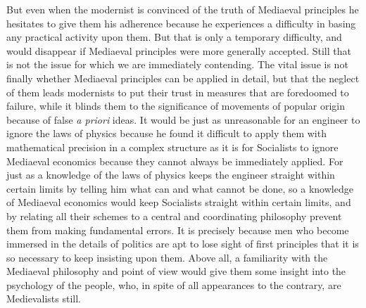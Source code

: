\documentclass{book}
\begin{document}
But even when the modernist is convinced of the truth of Mediaeval principles he hesitates to give them his adherence because he experiences a difficulty in basing any practical activity upon them. But that is only a temporary difficulty, and would disappear if Mediaeval principles were more generally accepted. Still that is not the issue for which we are immediately contending. The vital issue is not finally whether Mediaeval principles can be applied in detail, but that the neglect of them leads modernists to put their trust in measures that are foredoomed to failure, while it blinds them to the significance of movements of popular origin because of false \emph{a priori} ideas. It would be just as unreasonable for an engineer to ignore the laws of physics because he found it difficult to apply them with mathematical precision in a complex structure as it is for Socialists to ignore Mediaeval economics because they cannot always be immediately applied. For just as a knowledge of the laws of physics keeps the engineer straight within certain limits by telling him what can and what cannot be done, so a knowledge of Mediaeval economics would keep Socialists straight within certain limits, and by relating all their schemes to a central and coordinating philosophy prevent them from making fundamental errors. It is precisely because men who become immersed in the details of politics are apt to lose sight of first principles that it is so necessary to keep insisting upon them. Above all, a familiarity with the Mediaeval philosophy and point of view would give them some insight into the psychology of the people, who, in spite of all appearances to the contrary, are Medievalists still.
\end{document}
